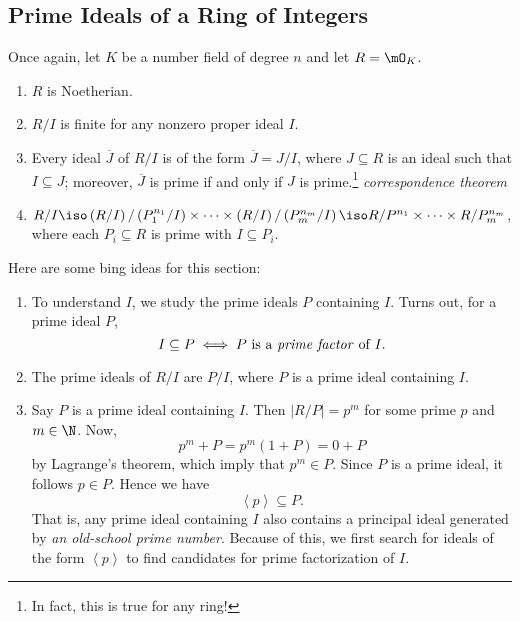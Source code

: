 \documentclass[pmath441]{subfiles}
\begin{document}
    \subsection{Prime Ideals of a Ring of Integers}

    \begin{boxyrecall}{}
    Once again, let $K$ be a number field of degree $n$ and let $R = \mO_K$. 
        \begin{enumerate}
            \item $R$ is Noetherian. 
            \item $R /I$ is finite for any nonzero proper ideal $I$.
            \item Every ideal $\overline{J}$ of $R /I$ is of the form $\overline{J} = J /I$, where $J\subseteq R$ is an ideal such that $I\subseteq J$; moreover, $\overline{J}$ is prime if and only if $J$ is prime.\footnote{In fact, this is true for any ring!} \hfill\textit{correspondence theorem}
            \item $R /I \iso \left( R /I \right) / \left( P_1^{n_1} / I \right) \times \cdots \times \left( R /I \right) / \left( P_m^{n_m} / I \right) \iso R /P^{n_1}\times\cdots\times R /P_m^{n_m}$, where each $P_i\subseteq R$ is prime with $I\subseteq P_i$.
        \end{enumerate}
    \end{boxyrecall}
    Here are some bing ideas for this section:
    \begin{enumerate}
        \item To understand $I$, we study the prime ideals $P$ containing $I$. Turns out, for a prime ideal $P$,
            \begin{equation*}
                I\subseteq P \iff P\text{ is a \textit{prime factor} of $I$}.
            \end{equation*}
        \item The prime ideals of $R /I$ are $P /I$, where $P$ is a prime ideal containing $I$.
        \item Say $P$ is a prime ideal containing $I$. Then $\left| R /P \right| = p^m$ for some prime $p$ and $m\in\N$. Now,
            \begin{equation*}
                p^m + P = p^m\left( 1+P \right) = 0+P
            \end{equation*}
            by Lagrange's theorem, which imply that $p^m\in P$. Since $P$ is a prime ideal, it follows $p\in P$. Hence we have
            \begin{equation*}
                \left< p \right> \subseteq P. 
            \end{equation*}
            That is, any prime ideal containing $I$ also contains a principal ideal generated by \textit{an old-school prime number}. Because of this, we first search for ideals of the form $\left< p \right>$ to find candidates for prime factorization of $I$. 
    \end{enumerate}
    
\end{document}

